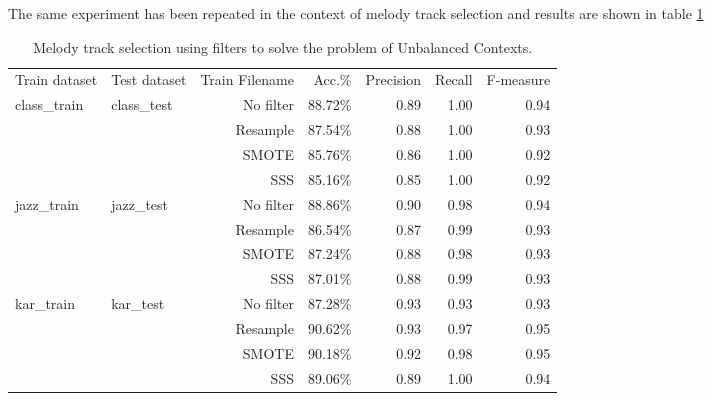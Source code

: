 \documentclass{article}
\begin{document}
The same experiment has been repeated in the context of melody track selection and results are shown in table \ref{table30}

\begin{table}
\small
\begin{center}
\begin{tabular}{  l | l | r | r | r | r | r }
\hline
 &  &  &  &  &  &  \\
\hline
Train dataset & Test dataset & Train Filename & Acc.\% & Precision & Recall & F-measure \\
\hline
\hline
class\_train & class\_test & No filter & 88.72\% & 0.89 & 1.00 & 0.94 \\
 &  & Resample & 87.54\% & 0.88 & 1.00 & 0.93 \\
 &  & SMOTE & 85.76\% & 0.86 & 1.00 & 0.92 \\
 &  & SSS & 85.16\% & 0.85 & 1.00 & 0.92 \\
\hline
jazz\_train & jazz\_test & No filter & 88.86\% & 0.90 & 0.98 & 0.94 \\
 &  & Resample & 86.54\% & 0.87 & 0.99 & 0.93 \\
 &  & SMOTE & 87.24\% & 0.88 & 0.98 & 0.93 \\
 &  & SSS & 87.01\% & 0.88 & 0.99 & 0.93 \\
\hline
kar\_train & kar\_test & No filter & 87.28\% & 0.93 & 0.93 & 0.93 \\
 &  & Resample & 90.62\% & 0.93 & 0.97 & 0.95 \\
 &  & SMOTE & 90.18\% & 0.92 & 0.98 & 0.95 \\
 &  & SSS & 89.06\% & 0.89 & 1.00 & 0.94 \\
\hline
\end{tabular}
\caption{Melody track selection using filters to solve the problem of Unbalanced Contexts.}
\label{table30}
\end{center}
\end{table}


































\newpage



\end{document}
